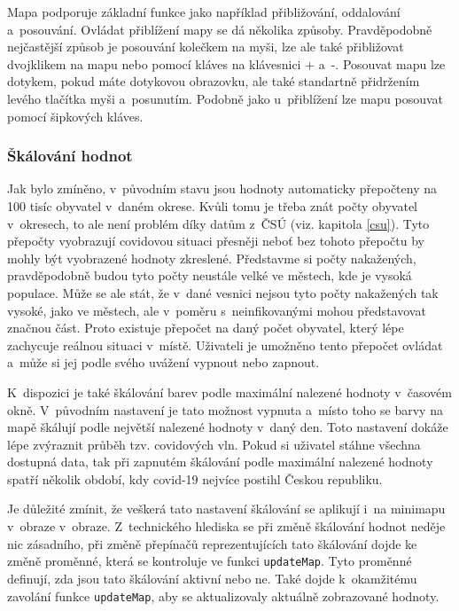 Mapa podporuje základní funkce jako například přibližování, oddalování a~posouvání. Ovládat přiblížení mapy se dá několika způsoby. Pravděpodobně nejčastější způsob je posouvání kolečkem na myši, lze ale také přibližovat dvojklikem na mapu nebo pomocí kláves na klávesnici + a~-. Posouvat mapu lze dotykem, pokud máte dotykovou obrazovku, ale také standartně přidržením levého tlačítka myši a~posunutím. Podobně jako u~přiblížení lze mapu posouvat pomocí šipkových kláves.

\subsubsection*{Škálování hodnot}

Jak bylo zmíněno, v~původním stavu jsou hodnoty automaticky přepočteny na 100 tisíc obyvatel v~daném okrese. Kvůli tomu je třeba znát počty obyvatel v~okresech, to ale není problém díky datům z~ČSÚ (viz. kapitola \ref{csu}). Tyto přepočty vyobrazují covidovou situaci přesněji neboť bez tohoto přepočtu by mohly být vyobrazené hodnoty zkreslené. Představme si počty nakažených, pravděpodobně budou tyto počty neustále velké ve městech, kde je vysoká populace. Může se ale stát, že v~dané vesnici nejsou tyto počty nakažených tak vysoké, jako ve městech, ale v~poměru s~neinfikovanými mohou představovat značnou část. Proto existuje přepočet na daný počet obyvatel, který lépe zachycuje reálnou situaci v~místě. Uživateli je umožněno tento přepočet ovládat a~může si jej podle svého uvážení vypnout nebo zapnout.

K~dispozici je také škálování barev podle maximální nalezené hodnoty v~časovém okně. V~původním nastavení je tato možnost vypnuta a~místo toho se barvy na mapě škálují podle největší nalezené hodnoty v~daný den. Toto nastavení dokáže lépe zvýraznit průběh tzv. covidových vln. Pokud si uživatel stáhne všechna dostupná data, tak při zapnutém škálování podle maximální nalezené hodnoty spatří několik období, kdy covid-19 nejvíce postihl Českou republiku.

Je důležité zmínit, že veškerá tato nastavení škálování se aplikují i~na minimapu v~obraze v~obraze. Z~technického hlediska se při změně škálování hodnot neděje nic zásadního, při změně přepínačů reprezentujících tato škálování dojde ke změně proměnné, která se kontroluje ve funkci \lstinline{updateMap}. Tyto proměnné definují, zda jsou tato škálování aktivní nebo ne. Také dojde k~okamžitému zavolání funkce \lstinline{updateMap}, aby se aktualizovaly aktuálně zobrazované hodnoty.

